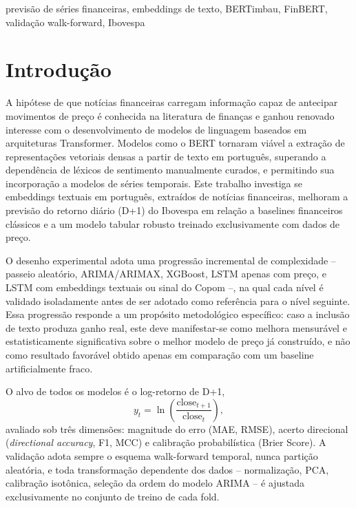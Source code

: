\documentclass[conference]{IEEEtran}
\begin{document}
\begin{abstract}
\end{abstract}

\begin{IEEEkeywords}
previs\~ao de s\'eries financeiras, embeddings de texto, BERTimbau, FinBERT, valida\c{c}\~ao walk-forward, Ibovespa
\end{IEEEkeywords}

\section{Introdu\c{c}\~ao}

A hip\'otese de que not\'icias financeiras carregam informa\c{c}\~ao capaz de antecipar movimentos de pre\c{c}o \'e conhecida na literatura de finan\c{c}as e ganhou renovado interesse com o desenvolvimento de modelos de linguagem baseados em arquiteturas Transformer. Modelos como o BERT tornaram vi\'avel a extra\c{c}\~ao de representa\c{c}\~oes vetoriais densas a partir de texto em portugu\^es, superando a depend\^encia de l\'exicos de sentimento manualmente curados, e permitindo sua incorpora\c{c}\~ao a modelos de s\'eries temporais. Este trabalho investiga se embeddings textuais em portugu\^es, extra\'idos de not\'icias financeiras, melhoram a previs\~ao do retorno di\'ario (D+1) do Ibovespa em rela\c{c}\~ao a baselines financeiros cl\'assicos e a um modelo tabular robusto treinado exclusivamente com dados de pre\c{c}o.

O desenho experimental adota uma progress\~ao incremental de complexidade -- passeio aleat\'orio, ARIMA/ARIMAX, XGBoost, LSTM apenas com pre\c{c}o, e LSTM com embeddings textuais ou sinal do Copom --, na qual cada n\'ivel \'e validado isoladamente antes de ser adotado como refer\^encia para o n\'ivel seguinte. Essa progress\~ao responde a um prop\'osito metodol\'ogico espec\'ifico: caso a inclus\~ao de texto produza ganho real, este deve manifestar-se como melhora mensur\'avel e estatisticamente significativa sobre o melhor modelo de pre\c{c}o j\'a constru\'ido, e n\~ao como resultado favor\'avel obtido apenas em compara\c{c}\~ao com um baseline artificialmente fraco.

O alvo de todos os modelos \'e o log-retorno de D+1,
\begin{equation}
y_t = \ln\!\left(\frac{\text{close}_{t+1}}{\text{close}_t}\right),
\label{eq:target}
\end{equation}
avaliado sob tr\^es dimens\~oes: magnitude do erro (MAE, RMSE), acerto direcional (\emph{directional accuracy}, F1, MCC) e calibra\c{c}\~ao probabil\'istica (Brier Score). A valida\c{c}\~ao adota sempre o esquema walk-forward temporal, nunca parti\c{c}\~ao aleat\'oria, e toda transforma\c{c}\~ao dependente dos dados -- normaliza\c{c}\~ao, PCA, calibra\c{c}\~ao isot\^onica, sele\c{c}\~ao da ordem do modelo ARIMA -- \'e ajustada exclusivamente no conjunto de treino de cada fold.
\end{document}
